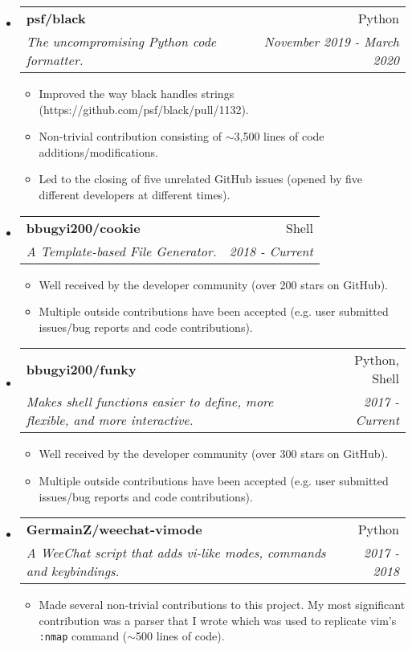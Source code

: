 \documentclass[letterpaper,11pt]{article}
\makeatletter
\newcommand{\ressubheading}[4]{
\begin{tabular*}{6.5in}{l@{\cftdotfill{\cftsecdotsep}\extracolsep{\fill}}r}
		\textbf{#1} & #2 \\
		\textit{#3} & \textit{#4} \\
\end{tabular*}\vspace{-6pt}}
\makeatother
\begin{document}
\begin{itemize}
    \item \ressubheading{psf/black}{Python}{The uncompromising Python code formatter.}{November 2019 - March 2020}
    \begin{itemize}
        \item
            Improved the way black handles strings (https://github.com/psf/black/pull/1132).
        \item
            Non-trivial contribution consisting of $\sim$3,500 lines of code additions/modifications.
        \item
            Led to the closing of five unrelated GitHub issues (opened by five different developers at different times).
    \end{itemize}
\item \ressubheading{bbugyi200/cookie}{Shell}{A Template-based File Generator.}{2018 - Current}
    \begin{itemize}
        \item
            Well received by the developer community (over 200 stars on GitHub).
        \item
            Multiple outside contributions have been accepted (e.g. user submitted issues/bug reports and code contributions).
    \end{itemize}
\item \ressubheading{bbugyi200/funky}{Python, Shell}{Makes shell functions easier to define, more flexible, and more interactive.}{2017 - Current}
    \begin{itemize}
        \item
            Well received by the developer community (over 300 stars on GitHub).
        \item
            Multiple outside contributions have been accepted (e.g. user submitted issues/bug reports and code contributions).
    \end{itemize}
\item \ressubheading{GermainZ/weechat-vimode}{Python}{A WeeChat script that adds vi-like modes, commands and keybindings.}{2017 - 2018}
    \begin{itemize}
        \item
            Made several non-trivial contributions to this project. My most significant contribution was a parser that I wrote which was used to replicate vim's \texttt{:nmap} command ($\sim$500 lines of code).
    \end{itemize}
\end{itemize}
\end{document}

